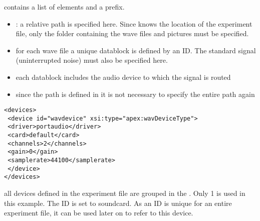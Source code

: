  contains a list of 
elements and a prefix.

\begin{itemize}
\item {}: a relative path is specified here.
Since \apex knows the location of the experiment file, only the
folder containing the wave files and pictures must be specified.



\item {} for each wave file a unique datablock is
defined by an ID. The standard signal (uninterrupted noise) must
also be specified here.

\item {} each datablock includes the audio device to
which the signal is routed

\item {} since the path is defined in
 it is not necessary to specify the entire
path again

  
 

\end{itemize}
\begin{lstlisting}
<devices>
 <device id="wavdevice" xsi:type="apex:wavDeviceType">
 <driver>portaudio</driver>
 <card>default</card>
 <channels>2</channels>
 <gain>0</gain>
 <samplerate>44100</samplerate>
 </device>
</devices>
\end{lstlisting}


 all devices defined in the experiment file are
grouped in the . Only 1  is used
in this example. The ID is set to soundcard. As an ID is unique
for an entire experiment file, it can be used later on to refer to
this device.

